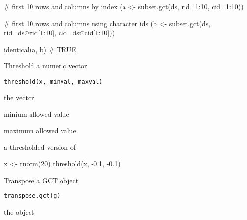 \documentclass[letterpaper]{book}
\begin{document}
%
\begin{Examples}
\begin{ExampleCode}
# first 10 rows and columns by index
(a <- subset.gct(ds, rid=1:10, cid=1:10))

# first 10 rows and columns using character ids
(b <- subset.gct(ds, rid=ds@rid[1:10], cid=ds@cid[1:10]))

identical(a, b) # TRUE

\end{ExampleCode}
\end{Examples}
%
\begin{Description}\relax
Threshold a numeric vector
\end{Description}
%
\begin{Usage}
\begin{verbatim}
threshold(x, minval, maxval)
\end{verbatim}
\end{Usage}
%
\begin{Arguments}
\begin{ldescription}
\item[\code{x}] the vector

\item[\code{minval}] minium allowed value

\item[\code{maxval}] maximum allowed value
\end{ldescription}
\end{Arguments}
%
\begin{Value}
a thresholded version of 
\end{Value}
%
\begin{Examples}
\begin{ExampleCode}
x <- rnorm(20)
threshold(x, -0.1, -0.1)

\end{ExampleCode}
\end{Examples}
%
\begin{Description}\relax
Transpose a GCT object
\end{Description}
%
\begin{Usage}
\begin{verbatim}
transpose.gct(g)
\end{verbatim}
\end{Usage}
%
\begin{Arguments}
\begin{ldescription}
\item[\code{g}] the  object
\end{ldescription}
\end{Arguments}
\end{document}
